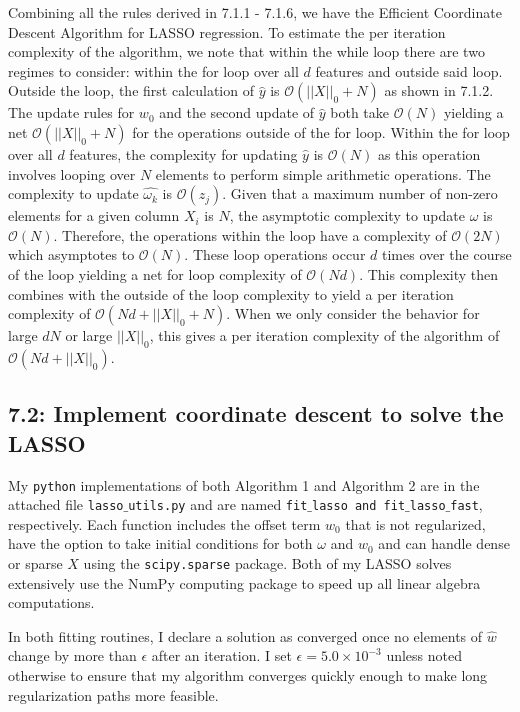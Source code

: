 \documentclass[12pt]{amsart}
\begin{document}
Combining all the rules derived in 7.1.1 - 7.1.6, we have the Efficient Coordinate Descent Algorithm for LASSO regression.  To estimate the per iteration complexity of the algorithm, we note that within the while loop there are two regimes to consider: within the for loop over all $d$ features and outside said loop.  Outside the loop, the first calculation of $\hat{y}$ is $\mathcal{O}(||X||_0 + N)$ as shown in 7.1.2.  The update rules for $w_0$ and the second update of $\hat{y}$ both take $\mathcal{O}(N)$ yielding a net $\mathcal{O}(||X||_0 + N)$ for the operations outside of the for loop.  Within the for loop over all $d$ features, the complexity for updating $\hat{y}$ is $\mathcal{O}(N)$ as this operation involves looping over $N$ elements to perform simple arithmetic operations.  The complexity to update $\hat{\omega_k}$ is $\mathcal{O}(z_j)$.  Given that a maximum number of non-zero elements for a given column $X_i$ is $N$, the asymptotic complexity to update $\hat{\omega}$ is $\mathcal{O}(N)$.  Therefore, the operations within the loop have a complexity of $\mathcal{O}(2N)$ which asymptotes to $\mathcal{O}(N)$.  These loop operations occur $d$ times over the course of the loop yielding a net for loop complexity of $\mathcal{O}(Nd)$.  This complexity then combines with the outside of the loop complexity to yield a per iteration complexity of $\mathcal{O}(Nd + ||X||_0 + N)$.  When we only consider the behavior for large $dN$ or large $||X||_0$, this gives a per iteration complexity of the algorithm of $\mathcal{O}(Nd + ||X||_0)$.

\subsection*{7.2: Implement coordinate descent to solve the LASSO}

My {\tt python} implementations of both Algorithm 1 and Algorithm 2 are in the attached file {\tt lasso$\_$utils.py} and are named {\tt fit$\_$lasso and fit$\_$lasso$\_$fast}, respectively.  Each function includes the offset term $w_0$ that is not regularized, have the option to take initial conditions for both $\omega$ and $w_0$ and can handle dense or sparse $X$ using the {\tt scipy.sparse} package.  Both of my LASSO solves extensively use the NumPy computing package to speed up all linear algebra computations.  

In both fitting routines, I declare a solution as converged once no elements of $\hat{w}$ change by more than $\epsilon$ after an iteration.  I set $\epsilon = 5.0 \times 10^{-3}$ unless noted otherwise to ensure that my algorithm converges quickly enough to make long regularization paths more feasible.  
\end{document}
